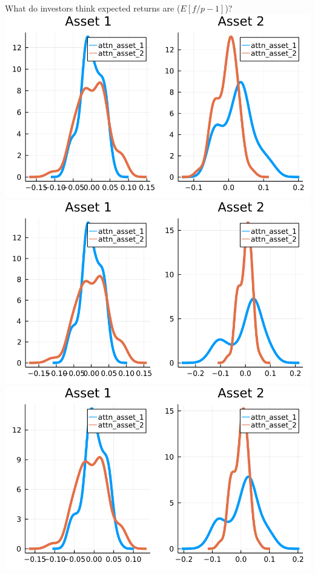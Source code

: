 \documentclass[
  ignorenonframetext,
]{beamer}
\begin{document}
\begin{frame}{What do investors think expected returns are
(\(E[f/p - 1]\))?}
\protect\hypertarget{what-do-investors-think-expected-returns-are-efp---1}{}
\includegraphics[width=0.4\paperheight]{complexity_files/figure-beamer/unnamed-chunk-15-1}
\includegraphics[width=0.4\paperheight]{complexity_files/figure-beamer/unnamed-chunk-15-2}
\includegraphics[width=0.4\paperheight]{complexity_files/figure-beamer/unnamed-chunk-15-3}

\end{frame}
\end{document}
